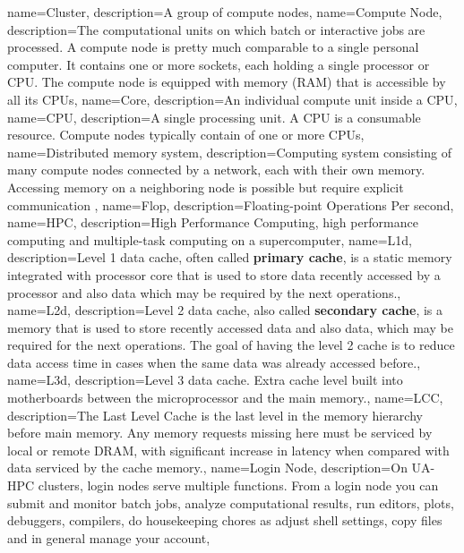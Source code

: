 {
  name={Cluster},
  description={A group of compute nodes},
}
{
  name={Compute Node},
  description={The computational units on which batch or interactive jobs are processed. A compute node is pretty much comparable to a single personal computer. It contains one or more sockets, each holding a single processor or CPU. The compute node is equipped with memory (RAM) that is accessible by all its CPUs},
}
{
  name={Core},
  description={An individual compute unit inside a CPU},
}
{
  name={CPU},
  description={A single processing unit. A CPU is a consumable resource. Compute nodes typically contain of one or more CPUs},
}
{
  name={Distributed memory system},
  description={Computing system consisting of many compute nodes connected by a network, each with their own memory. Accessing memory on a neighboring node is possible but require explicit communication },
}
{
  name={Flop},
  description={Floating-point Operations Per second},
}
{
  name={HPC},
  description={High Performance Computing, high performance computing and multiple-task computing on a supercomputer},
}
{
  name={L1d},
  description={Level 1 data cache, often called \textbf{primary cache}, is a static memory integrated with processor core that is used to store data recently accessed by a processor and also data which may be required by the next operations.},
}
{
  name={L2d},
  description={Level 2 data cache, also called \textbf{secondary cache}, is a memory that is used to store recently accessed data and also data, which may be required for the next operations. The goal of having the level 2 cache is to reduce data access time in cases when the same data was already accessed before.},
}
{
  name={L3d},
  description={Level 3 data cache. Extra cache level built into motherboards between the microprocessor and the main memory.},
}
{
  name={LCC},
  description={The Last Level Cache is the last level in the memory hierarchy before main memory. Any memory requests missing here must be serviced by local or remote DRAM, with significant increase in latency when compared with data serviced by the cache memory.},
}
{
  name={Login Node},
  description={On UA-HPC clusters, login nodes serve multiple functions. From a login node you can submit and monitor batch jobs, analyze computational results, run editors, plots, debuggers, compilers, do housekeeping chores as adjust shell settings, copy files and in general manage your account},
}
